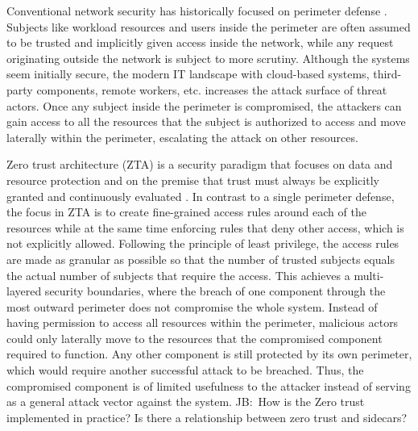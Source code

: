 \documentclass[english, 12pt, a4paper, sci, utf8, a-2b, online]{aaltothesis}
\newcommand{\mycomment}[3]{\textcolor{#1}{#2:~#3}}
\newcommand{\jb}[1]{\noindent\mycomment{aaltoRed}{JB}{#1}}
\begin{document}
Conventional network security has historically focused on perimeter defense \cite{kerman2020implementing}.
Subjects like workload resources and users inside the perimeter are often assumed to be trusted and implicitly given access inside the network, while any request originating outside the network is subject to more scrutiny.
Although the systems seem initially secure, the modern IT landscape with cloud-based systems, third-party components, remote workers, etc. increases the attack surface of threat actors.
Once any subject inside the perimeter is compromised, the attackers can gain access to all the resources that the subject is authorized to access and move laterally within the perimeter, escalating the attack on other resources.


Zero trust architecture (ZTA) is a security paradigm that focuses on data and resource protection and on the premise that trust must always be explicitly granted and continuously evaluated \cite{kerman2020implementing, rose2020zero}.
In contrast to a single perimeter defense, the focus in ZTA is to create fine-grained access rules around each of the resources while at the same time enforcing rules that deny other access, which is not explicitly allowed.
Following the principle of least privilege, the access rules are made as granular as possible so that the number of trusted subjects equals the actual number of subjects that require the access.
This achieves a multi-layered security boundaries, where the breach of one component through the most outward perimeter does not compromise the whole system.
Instead of having permission to access all resources within the perimeter, malicious actors could only laterally move to the resources that the compromised component required to function.
Any other component is still protected by its own perimeter, which would require another successful attack to be breached.
Thus, the compromised component is of limited usefulness to the attacker instead of serving as a general attack vector against the system.
\jb{How is the Zero trust implemented in practice? Is there a relationship between zero trust and sidecars?}
\end{document}
